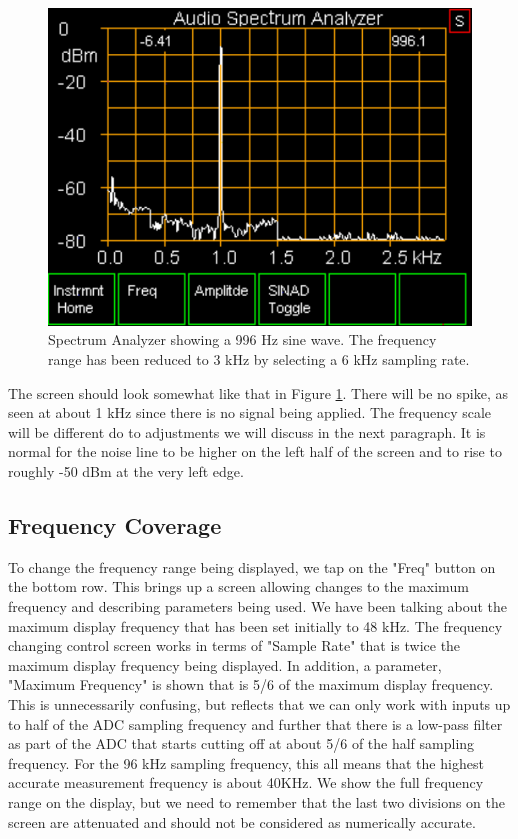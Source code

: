 \begin{figure}[H]
\begin{center}
\includegraphics[scale=0.75]{./images/AVNA_019.pdf}
\caption{Spectrum Analyzer  showing a 996 Hz sine wave.  The frequency range has been reduced to 3 kHz by selecting a 6 kHz sampling rate. }
\label{AVNA_019-label}
\end{center}
\end{figure}
%
The screen should look somewhat like that in Figure \ref{AVNA_019-label}.  There will be no spike, as seen at about 1 kHz since there is no signal being applied.  The frequency scale will be different do to adjustments we will discuss in the next paragraph.  It is normal for the noise line to be higher on the left half of the screen and to rise to roughly -50 dBm at the very left edge.

\subsection{Frequency Coverage} To change the frequency range being displayed, we tap on the "\textsf{Freq}" button on the bottom row.  This brings up a screen allowing changes to the maximum frequency and describing parameters  being used.  We have been talking about the maximum display frequency that has been set initially to 48 kHz.  The frequency changing control screen works in terms of "Sample Rate" that is twice the maximum display frequency being displayed.  In addition, a parameter, "Maximum Frequency" is shown that is 5/6 of the maximum display frequency.  This is unnecessarily confusing, but reflects that we can only work with inputs up to half of the ADC sampling frequency and further that there is a low-pass filter as part of the ADC that starts cutting off at about 5/6 of the half sampling frequency.  For the 96 kHz sampling frequency, this all means that the highest accurate measurement frequency is about 40KHz.  We show the full frequency range on the display, but we need to remember that the last two divisions on the screen are attenuated and should not be considered as numerically accurate.

